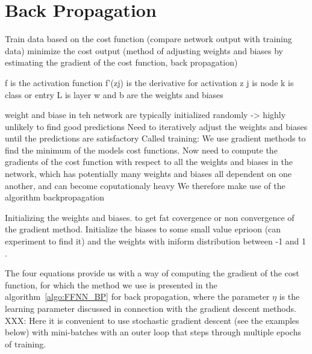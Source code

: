 \documentclass[english,notitlepage,reprint,nofootinbib]{revtex4-2}  %
\begin{document}
\section{Back Propagation} %

Train data based on the cost function (compare network output with training data) 
minimize the cost output (method of adjusting weights and biases by estimating the gradient of the cost function, back propagation) 

f is the activation function 
f'(zj) is the derivative for activation z 
j is node 
k is class or entry 
L is layer 
w and b are the weights and biases 

weight and biase in teh network are typically initialized randomly -> highly unlikely to find good predictions 
Need to iteratively adjust the weights and biases until the predictions are satisfactory 
Called training: We use gradient methods to find the minimum of the models cost functions. Now need to compute the gradients of the cost function with respect to all the weights and biases in the network, which has potentially many weights and biases all dependent on one another, and can become coputationaly heavy 
We therefore make use of the algorithm backpropagation 

Initializing the weights and biases. to get fat covergence or non convergence of the gradient method. Initialize the biases to some small value eprioon (can experiment to find it) and the weights with iniform distribution between -1 and 1 . 

The four equations provide us with a way of computing the gradient of the cost function, for which the method we use is presented in the algorithm~\ref{algo:FFNN_BP} for back propagation, where the parameter $\eta$ is the learning parameter discussed in connection with the gradient descent methods. 
XXX: Here it is convenient to use stochastic gradient descent (see the examples below) with mini-batches with an outer loop that steps through multiple epochs of training. 
\end{document}
